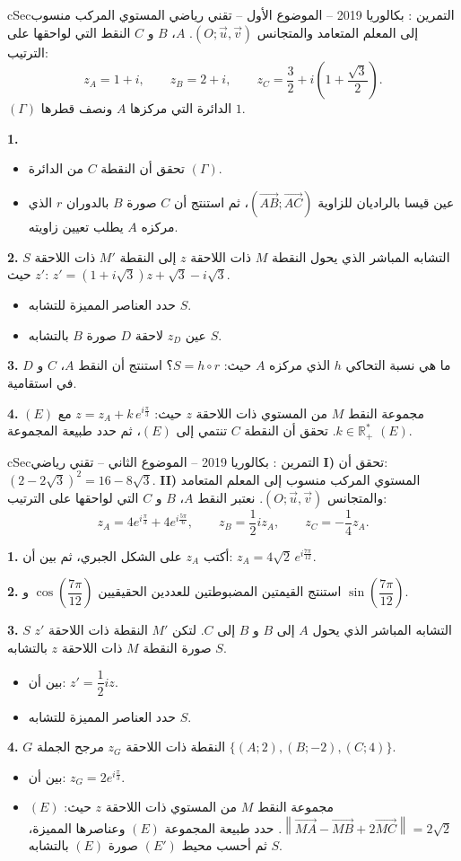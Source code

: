 \documentclass[12pt,a4paper]{article}
\newenvironment{BOX}[2]{\begin{otherlanguage}{english}\begin{arbox}{#1}{#2}}{\end{arbox}\end{otherlanguage}}
\newcounter{exo}
\newenvironment{tamrin}[1]{\stepcounter{exo}\begin{BOX}{cSec}{التمرين \theexo: #1}}{\end{BOX}}
\newenvironment{sq}{\begin{itemize}[leftmargin=2.4em,itemsep=3pt]}{\end{itemize}}
\newcommand{\qa}{\item[(أ)]}\newcommand{\qb}{\item[(ب)]}\newcommand{\qc}{\item[(جـ)]}\newcommand{\qd}{\item[(د)]}\newcommand{\qe}{\item[(هـ)]}
\newcommand{\QQ}[1]{\par\smallskip\textbf{#1.} }
\begin{document}
\begin{tamrin}{بكالوريا 2019 -- الموضوع الأول -- تقني رياضي}
المستوي المركب منسوب إلى المعلم المتعامد والمتجانس $(O;\vec u,\vec v)$. $A$، $B$ و $C$ النقط التي لواحقها على الترتيب:
\[z_A=1+i,\qquad z_B=2+i,\qquad z_C=\frac32+i\left(1+\frac{\sqrt3}{2}\right).\]
$(\Gamma)$ الدائرة التي مركزها $A$ ونصف قطرها $1$.

\QQ{1}
\begin{sq}
\qa تحقق أن النقطة $C$ من الدائرة $(\Gamma)$.
\qb عين قيسا بالراديان للزاوية $\left(\overrightarrow{AB};\overrightarrow{AC}\right)$، ثم استنتج أن $C$ صورة $B$ بالدوران $r$ الذي مركزه $A$ يطلب تعيين زاويته.
\end{sq}
\QQ{2} $S$ التشابه المباشر الذي يحول النقطة $M$ ذات اللاحقة $z$ إلى النقطة $M'$ ذات اللاحقة $z'$ حيث: $z'=(1+i\sqrt3)z+\sqrt3-i\sqrt3$.
\begin{sq}
\qa حدد العناصر المميزة للتشابه $S$.
\qb عين $z_D$ لاحقة $D$ صورة $B$ بالتشابه $S$.
\end{sq}
\QQ{3} ما هي نسبة التحاكي $h$ الذي مركزه $A$ حيث: $S=h\circ r$؟ استنتج أن النقط $A$، $C$ و $D$ في استقامية.

\QQ{4} $(E)$ مجموعة النقط $M$ من المستوي ذات اللاحقة $z$ حيث: $z=z_A+k\,e^{i\frac{\pi}{3}}$ مع $k\in\mathbb{R}_+^*$.
تحقق أن النقطة $C$ تنتمي إلى $(E)$، ثم حدد طبيعة المجموعة $(E)$.
\end{tamrin}

\begin{tamrin}{بكالوريا 2019 -- الموضوع الثاني -- تقني رياضي}
\textbf{I)} تحقق أن: $(2-2\sqrt3)^2=16-8\sqrt3$.
\textbf{II)} المستوي المركب منسوب إلى المعلم المتعامد والمتجانس $(O;\vec u,\vec v)$. نعتبر النقط $A$، $B$ و $C$ التي لواحقها على الترتيب:
\[z_A=4e^{i\frac{\pi}{3}}+4e^{i\frac{5\pi}{6}},\qquad z_B=\frac12iz_A,\qquad z_C=-\frac14z_A.\]
\QQ{1} أكتب $z_A$ على الشكل الجبري، ثم بين أن: $z_A=4\sqrt2\,e^{i\frac{7\pi}{12}}$.

\QQ{2} استنتج القيمتين المضبوطتين للعددين الحقيقيين $\cos\left(\dfrac{7\pi}{12}\right)$ و $\sin\left(\dfrac{7\pi}{12}\right)$.

\QQ{3} $S$ التشابه المباشر الذي يحول $A$ إلى $B$ و $B$ إلى $C$. لتكن $M'$ النقطة ذات اللاحقة $z'$ صورة النقطة $M$ ذات اللاحقة $z$ بالتشابه $S$.
\begin{sq}
\qa بين أن: $z'=\dfrac12iz$.
\qb حدد العناصر المميزة للتشابه $S$.
\end{sq}
\QQ{4} $G$ النقطة ذات اللاحقة $z_G$ مرجح الجملة $\{(A;2),(B;-2),(C;4)\}$.
\begin{sq}
\qa بين أن: $z_G=2e^{i\frac{\pi}{3}}$.
\qb $(E)$ مجموعة النقط $M$ من المستوي ذات اللاحقة $z$ حيث: $\left\|\overrightarrow{MA}-\overrightarrow{MB}+2\overrightarrow{MC}\right\|=2\sqrt2$.
حدد طبيعة المجموعة $(E)$ وعناصرها المميزة، ثم أحسب محيط $(E')$ صورة $(E)$ بالتشابه $S$.
\end{sq}
\end{tamrin}
\end{document}
